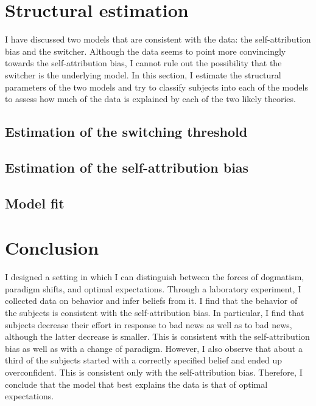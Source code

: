 \documentclass[
  12pt,
]{article}
\begin{document}
\hypertarget{structural-estimation}{%
\section{Structural estimation}\label{structural-estimation}}

I have discussed two models that are consistent with the data: the
self-attribution bias and the switcher. Although the data seems to point
more convincingly towards the self-attribution bias, I cannot rule out
the possibility that the switcher is the underlying model. In this
section, I estimate the structural parameters of the two models and try
to classify subjects into each of the models to assess how much of the
data is explained by each of the two likely theories.

\hypertarget{estimation-of-the-switching-threshold}{%
\subsection{Estimation of the switching
threshold}\label{estimation-of-the-switching-threshold}}

\hypertarget{estimation-of-the-self-attribution-bias}{%
\subsection{Estimation of the self-attribution
bias}\label{estimation-of-the-self-attribution-bias}}

\hypertarget{model-fit}{%
\subsection{Model fit}\label{model-fit}}

\hypertarget{conclusion}{%
\section{Conclusion}\label{conclusion}}

I designed a setting in which I can distinguish between the forces of
dogmatism, paradigm shifts, and optimal expectations. Through a
laboratory experiment, I collected data on behavior and infer beliefs
from it. I find that the behavior of the subjects is consistent with the
self-attribution bias. In particular, I find that subjects decrease
their effort in response to bad news as well as to bad news, although
the latter decrease is smaller. This is consistent with the
self-attribution bias as well as with a change of paradigm. However, I
also observe that about a third of the subjects started with a correctly
specified belief and ended up overconfident. This is consistent only
with the self-attribution bias. Therefore, I conclude that the model
that best explains the data is that of optimal expectations.
\end{document}
